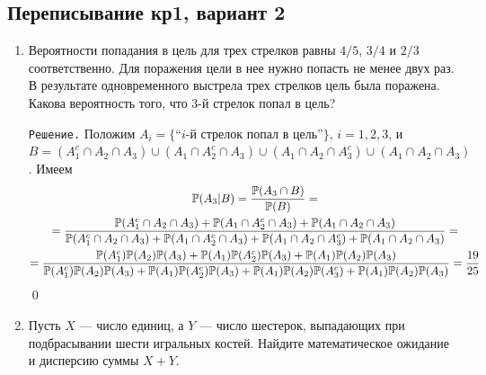 \documentclass[12pt, a4paper]{article}\usepackage[]{graphicx}\usepackage[]{color}
\begin{document}
				\subsection{Переписывание кр1, вариант 2}
				\begin{enumerate}
					\item %
					Вероятности попадания в цель для трех стрелков равны $4/5$, $3/4$ и $2/3$ соответственно. Для поражения цели в нее нужно попасть не менее двух раз. В результате одновременного выстрела трех стрелков цель была поражена. Какова вероятность того, что 3-й стрелок попал в цель?

					\verb"Решение." Положим $A_i = \{\text{``$i$-й стрелок попал в цель''}\}$, $i = 1,2,3$, и $B = (A_1^c \cap A_2 \cap A_3) \cup (A_1 \cap A_2^c \cap A_3) \cup (A_1 \cap A_2 \cap A_3^c) \cup (A_1 \cap A_2 \cap A_3)$. Имеем
					\begin{multline}
					\P(A_3|B) = \frac{\P(A_3 \cap B)}{\P(B)} = \\
					= \frac{\P(A_1^c \cap A_2 \cap A_3) + \P(A_1 \cap A_2^c \cap A_3) + \P(A_1 \cap A_2 \cap A_3)}{\P(A_1^c \cap A_2 \cap A_3) + \P(A_1 \cap A_2^c \cap A_3) + \P(A_1 \cap A_2 \cap A_3^c) + \P(A_1 \cap A_2 \cap A_3)} = \\
					= \frac{\P(A_1^c)\P(A_2)\P(A_3) + \P(A_1)\P(A_2^c)\P(A_3) + \P(A_1)\P(A_2)\P(A_3)}{\P(A_1^c)\P(A_2)\P(A_3) + \P(A_1)\P(A_2^c)\P(A_3) + \P(A_1)\P(A_2)\P(A_3^c) + \P(A_1)\P(A_2)\P(A_3)} = \frac{19}{25}
					\end{multline}
					\qed
					\item %
					Пусть $X$ — число единиц, а $Y$ — число шестерок, выпадающих при подбрасывании шести игральных костей. Найдите математическое ожидание и дисперсию суммы $X+Y$.


\end{enumerate}
\end{document}
